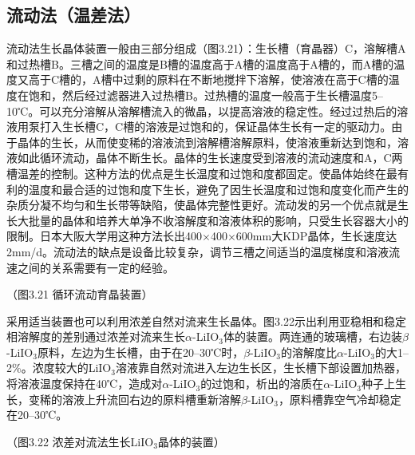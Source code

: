﻿\subsection{流动法（温差法）}
流动法生长晶体装置一般由三部分组成（图3.21）：生长槽（育晶器）C，溶解槽A和过热槽B。三槽之间的温度是B槽的温度高于A槽的温度高于A槽的，而A槽的温度又高于C槽的，A槽中过剩的原料在不断地搅拌下溶解，使溶液在高于C槽的温度在饱和，然后经过滤器进入过热槽B。过热槽的温度一般高于生长槽温度5--10℃。可以充分溶解从溶解槽流入的微晶，以提高溶液的稳定性。经过过热后的溶液用泵打入生长槽C，C槽的溶液是过饱和的，保证晶体生长有一定的驱动力。由于晶体的生长，从而使变稀的溶液流到溶解槽溶解原料，使溶液重新达到饱和，溶液如此循环流动，晶体不断生长。晶体的生长速度受到溶液的流动速度和A，C两槽温差的控制。这种方法的优点是生长温度和过饱和度都固定。使晶体始终在最有利的温度和最合适的过饱和度下生长，避免了因生长温度和过饱和度变化而产生的杂质分凝不均匀和生长带等缺陷，使晶体完整性更好。流动发的另一个优点就是生长大批量的晶体和培养大单净不收溶解度和溶液体积的影响，只受生长容器大小的限制。日本大阪大学用这种方法长出400$\times$400$\times$600mm大KDP晶体，生长速度达2mm/d。流动法的缺点是设备比较复杂，调节三槽之间适当的温度梯度和溶液流速之间的关系需要有一定的经验。

（图3.21  循环流动育晶装置）

采用适当装置也可以利用浓差自然对流来生长晶体。图3.22示出利用亚稳相和稳定相溶解度的差别通过浓差对流来生长$\alpha$-LiIO$_3$体的装置。两连通的玻璃槽，右边装$\beta$-LiIO$_3$原料，左边为生长槽，由于在20--30℃时，$\beta$-LiIO$_3$的溶解度比$\alpha$-LiIO$_3$的大1--2\%。浓度较大的LiIO$_3$溶液靠自然对流进入左边生长区，生长槽下部设置加热器，将溶液温度保持在40℃，造成对$\alpha$-LiIO$_3$的过饱和，析出的溶质在$\alpha$-LiIO$_3$种子上生长，变稀的溶液上升流回右边的原料槽重新溶解$\beta$-LiIO$_3$，原料槽靠空气冷却稳定在20--30℃。

（图3.22 浓差对流法生长LiIO$_3$晶体的装置）